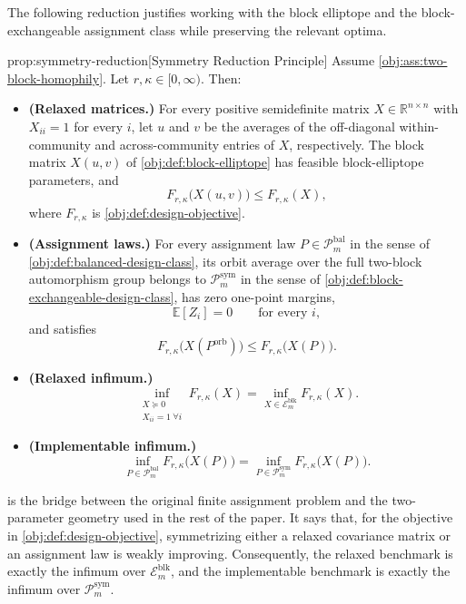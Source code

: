 \documentclass[11pt]{article}
\begin{document}
The following reduction justifies working with the block elliptope and the block-exchangeable assignment class while preserving the relevant optima.

\begin{propositionv}{prop:symmetry-reduction}[Symmetry Reduction Principle]
Assume \cref{obj:ass:two-block-homophily}. Let \(r,\kappa\in[0,\infty)\). Then:
\begin{itemize}
\item \textbf{(Relaxed matrices.)} For every positive semidefinite matrix \(X\in\mathbb R^{n\times n}\) with \(X_{ii}=1\) for every \(i\), let \(u\) and \(v\) be the averages of the off-diagonal within-community and across-community entries of \(X\), respectively. The block matrix \(X(u,v)\) of \cref{obj:def:block-elliptope} has feasible block-elliptope parameters, and
\[
F_{r,\kappa}\bigl(X(u,v)\bigr)\le F_{r,\kappa}(X),
\]
where \(F_{r,\kappa}\) is \cref{obj:def:design-objective}.
\item \textbf{(Assignment laws.)} For every assignment law \(P\in\mathcal P_m^{\mathrm{bal}}\) in the sense of \cref{obj:def:balanced-design-class}, its orbit average over the full two-block automorphism group belongs to \(\mathcal P_m^{\mathrm{sym}}\) in the sense of \cref{obj:def:block-exchangeable-design-class}, has zero one-point margins,
\[
\mathbb E[Z_i]=0\qquad\text{for every }i,
\]
and satisfies
\[
F_{r,\kappa}\bigl(X(P^{\mathrm{orb}})\bigr)\le F_{r,\kappa}\bigl(X(P)\bigr).
\]
\item \textbf{(Relaxed infimum.)}
\[
\inf_{\substack{X\succeq0\\ X_{ii}=1\ \forall i}} F_{r,\kappa}(X)
=
\inf_{X\in\mathcal E_m^{\mathrm{blk}}} F_{r,\kappa}(X).
\]
\item \textbf{(Implementable infimum.)}
\[
\inf_{P\in\mathcal P_m^{\mathrm{bal}}} F_{r,\kappa}\bigl(X(P)\bigr)
=
\inf_{P\in\mathcal P_m^{\mathrm{sym}}} F_{r,\kappa}\bigl(X(P)\bigr).
\]
\end{itemize}
\end{propositionv}

 is the bridge between the original finite assignment problem and the two-parameter geometry used in the rest of the paper. It says that, for the objective in \cref{obj:def:design-objective}, symmetrizing either a relaxed covariance matrix or an assignment law is weakly improving. Consequently, the relaxed benchmark is exactly the infimum over \(\mathcal E_m^{\mathrm{blk}}\), and the implementable benchmark is exactly the infimum over \(\mathcal P_m^{\mathrm{sym}}\).
\end{document}
